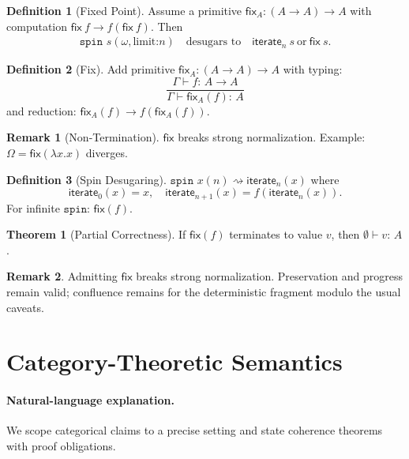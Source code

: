 \documentclass[12pt]{article}
\newcommand{\Entails}{\vdash}
\newcommand{\Types}{:\,}
\newcommand{\Ctx}{\Gamma}
\newcommand{\step}{\rightarrow}
\theoremstyle{definition}
\newtheorem{definition}{Definition}
\newtheorem{theorem}{Theorem}
\newtheorem{remark}{Remark}
\begin{document}
\begin{definition}[Fixed Point]
Assume a primitive $\mathsf{fix}_{A} : (A\to A)\to A$ with computation $\mathsf{fix}\ f \step f(\mathsf{fix}\ f)$. Then
\begin{align*}
\texttt{spin } s(\omega,\text{limit:}n) \quad\text{desugars to}\quad \mathsf{iterate}_n\ s ~\text{or}~ \mathsf{fix}\ s.
\end{align*}
\end{definition}

\begin{definition}[Fix]
Add primitive $\mathsf{fix}_A : (A \to A) \to A$ with typing:
$$\dfrac{\Ctx \Entails f \Types A \to A}{\Ctx \Entails \mathsf{fix}_A(f) \Types A}$$
and reduction: $\mathsf{fix}_A(f) \step f(\mathsf{fix}_A(f))$.
\end{definition}

\begin{remark}[Non-Termination]
$\mathsf{fix}$ breaks strong normalization. Example: $\Omega = \mathsf{fix}(\lambda x. x)$ diverges.
\end{remark}

\begin{definition}[Spin Desugaring]
$\texttt{spin } x(n) \rightsquigarrow \mathsf{iterate}_n(x)$ where
$$\mathsf{iterate}_0(x) = x, \quad \mathsf{iterate}_{n+1}(x) = f(\mathsf{iterate}_n(x)).$$
For infinite $\texttt{spin}$: $\mathsf{fix}(f)$.
\end{definition}

\begin{theorem}[Partial Correctness]
If $\mathsf{fix}(f)$ terminates to value $v$, then $\emptyset \Entails v \Types A$.
\end{theorem}

\begin{remark}
Admitting $\mathsf{fix}$ breaks strong normalization. Preservation and progress remain valid; confluence remains for the deterministic fragment modulo the usual caveats.
\end{remark}

\section{Category-Theoretic Semantics}
\paragraph{Natural-language explanation.}
We scope categorical claims to a precise setting and state coherence theorems with proof obligations.
\end{document}
